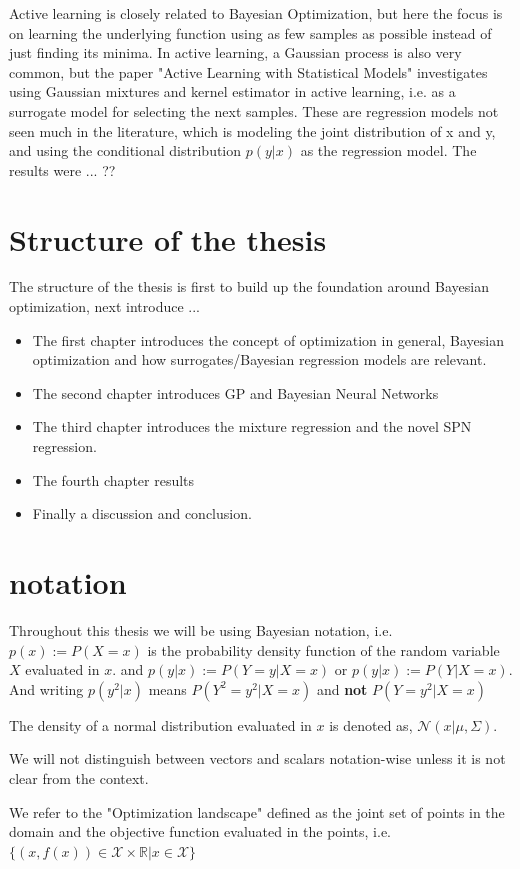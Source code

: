 Active learning is closely related to Bayesian Optimization, but here the focus is on learning the underlying function
using as few samples as possible instead of just finding its minima. 
In active learning, a Gaussian process is also very common, but the paper "Active Learning with Statistical Models" \cite{ALStatisticalModels}
investigates using Gaussian mixtures and kernel estimator in active learning, i.e. as a surrogate model for selecting
the next samples. These are regression models not seen much in the literature, which
is modeling the joint distribution of x and y, and using the conditional distribution $p(y|x)$
as the regression model. The results were ... ??

\section{Structure of the thesis}
The structure of the thesis is first to build up the foundation around Bayesian optimization, 
next introduce ...
\begin{itemize}
    \item The first chapter introduces the concept of optimization in general, Bayesian optimization 
    and how surrogates/Bayesian regression models are relevant.
    \item The second chapter introduces GP and Bayesian Neural Networks
    \item The third chapter introduces the mixture regression and the novel SPN regression.
    \item The fourth chapter results
    \item Finally a discussion and conclusion.
\end{itemize}


\section{notation}
Throughout this thesis we will be using Bayesian notation, i.e. $p(x) := P(X=x)$ is the probability
density function of the random variable $X$ evaluated in $x$. and $p(y|x) := P(Y=y|X=x)$ or $p(y|x)
:= P(Y|X=x)$. And writing $p(y^2|x)$ means $P(Y^2=y^2|X=x)$ and \textbf{not} $P(Y=y^2|X=x)$

The density of a normal distribution evaluated in $x$ is denoted as, $\mathcal{N}(x|\mu, \Sigma)$. 

We will not distinguish between vectors and scalars notation-wise unless it is not clear from the 
context. 

We refer to the "Optimization landscape" defined as the joint set of points in the domain and the objective function
evaluated in the points, i.e. $\{(x,f(x))\in \mathcal{X} \times \mathbb{R}| x \in \mathcal{X}\}$
